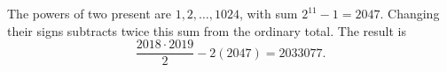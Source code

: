 The powers of two present are $1,2,\ldots,1024$, with sum $2^{11}-1=2047$. Changing their signs subtracts twice this sum from the ordinary total. The result is
\[
\dfrac{2018\cdot2019}{2}-2(2047)=\boxed{2033077}.
\]
